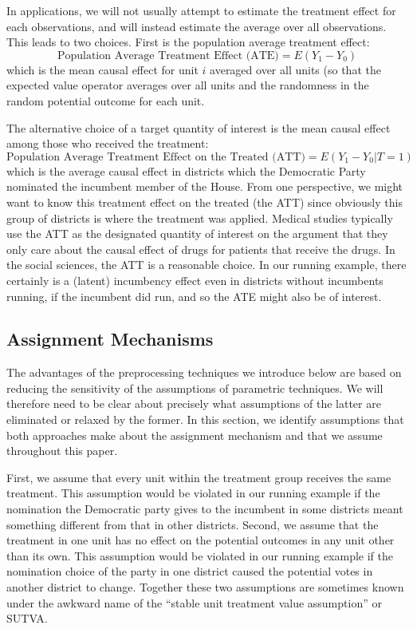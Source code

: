 \documentclass[11pt,titlepage]{article}
\begin{document}
In applications, we will not usually attempt to estimate the treatment
effect for each observations, and will instead estimate the average
over all observations.  This leads to two choices.  First is the
population average treatment effect:
\begin{equation}
  \label{pate}
  \text{Population Average Treatment Effect (ATE)} = E(Y_1 - Y_0)
\end{equation}
which is the mean causal effect for unit $i$ averaged over all units
(so that the expected value operator averages over all units and the
randomness in the random potential outcome for each unit.

The alternative choice of a target quantity of interest is the mean
causal effect among those who received the treatment:
\begin{equation}
  \label{att}
  \text{Population Average Treatment Effect on the Treated (ATT)} = E(Y_1 - Y_0|T=1)
\end{equation}
which is the average causal effect in districts which the Democratic
Party nominated the incumbent member of the House.  From one
perspective, we might want to know this treatment effect on the
treated (the ATT) since obviously this group of districts is where the
treatment was applied.  Medical studies typically use the ATT as the
designated quantity of interest on the argument that they only care
about the causal effect of drugs for patients that receive the drugs.
In the social sciences, the ATT is a reasonable choice.  In our
running example, there certainly is a (latent) incumbency effect even
in districts without incumbents running, if the incumbent did run, and
so the ATE might also be of interest.

\subsection{Assignment Mechanisms}

The advantages of the preprocessing techniques we introduce below are
based on reducing the sensitivity of the assumptions of parametric
techniques.  We will therefore need to be clear about precisely what
assumptions of the latter are eliminated or relaxed by the former.  In
this section, we identify assumptions that both approaches make about
the assignment mechanism and that we assume throughout this paper.

First, we assume that every unit within the treatment group receives
the same treatment.  This assumption would be violated in our running
example if the nomination the Democratic party gives to the incumbent
in some districts meant something different from that in other
districts.  Second, we assume that the treatment in one unit has no
effect on the potential outcomes in any unit other than its own.  This
assumption would be violated in our running example if the nomination
choice of the party in one district caused the potential votes in
another district to change.  Together these two assumptions are
sometimes known under the awkward name of the ``stable unit treatment
value assumption'' or SUTVA.
\end{document}
